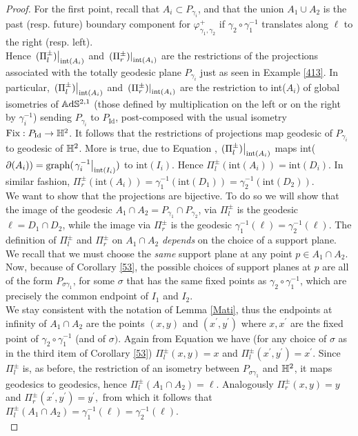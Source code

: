  \begin{proof}
     For the first point, recall that $A_i\subset P_{\gamma_i}$, and that the union $A_1\cup A_2$ is the past (resp. future) boundary component for $\varphi_{\gamma_1,\gamma_2}^+$ if $\gamma_2\circ\gamma_1^{-1}$ translates along $\ell$ to the right (resp. left). \\
     Hence $\left.(\Pi_l^\pm)\right|_{\text{int}(A_i)}$ and $\left.(\Pi_r^\pm)\right|_{\text{int}(A_i)}$ are the restrictions of the projections associated with the totally geodesic plane $P_{\gamma_i}$ just as seen in Example \ref{413}. In particular, $\left.(\Pi_l^\pm)\right|_{\text{int}(A_i)}$ and $\left.(\Pi_r^\pm)\right|_{\text{int}(A_i)}$ are the restriction to int($A_i$) of global isometries of $\mathbb{A}\mathrm{d}\mathbb{S}^{2,1}$ (those defined by multiplication on the left or on the right by $\gamma_i^{-1}$) sending $P_{\gamma_i}$ to $P_{\text{Id}}$, post-composed with the usual isometry $\text{Fix}:P_{\text{Id}}\to\mathbb{H}^2$. It follows that the restrictions of projections map geodesic of $P_{\gamma_i}$ to geodesic of $\mathbb{H}^2$. More is true, due to Equation , $\left.(\Pi_l^\pm)\right|_{\text{int}(A_i)}$ maps int($\partial(A_i))=\text{graph(\ensuremath{\left.\gamma_i^{-1}\right|_{\text{int}(I_i)}})}$ to $\text{int}(I_i).$ Hence $\Pi_l^\pm(\text{int}(A_i))=\text{int}(D_i)$. In similar fashion, $\Pi_r^\pm(\text{int}(A_i))=\gamma_1^{-1}(\text{int}(D_1))=\gamma_2^{-1}(\text{int}(D_2)).$\\
  We want to show that the projections are bijective. To do so we will show that the image of the geodesic $A_1\cap A_2=P_{\gamma_1}\cap P_{\gamma_2}$, via $\Pi_l^\pm$ is the geodesic $\ell=D_{1}\cap D_2$, while the image via $\Pi_r^\pm$ is the geodesic $\gamma_1^{-1}(\ell)=\gamma_2^{-1}(\ell).$ The definition of $\Pi_l^\pm$ and $\Pi_r^\pm$ on $A_1\cap A_2$ \textit{depends} on the choice of a support plane. We recall that we must choose the \textit{same} support plane at any point $p\in A_1\cap A_2$. Now, because of Corollary \ref{53}, the possible choices of support planes at $p$ are all of the form $P_{\sigma\gamma_1}$, for some $\sigma$ that has the same fixed points as $\gamma_2\circ\gamma_1^{-1}$, which are precisely the common endpoint of $I_1$ and $I_2$. \\
  We stay consistent with the notation of Lemma \ref{Mati}, thus the endpoints at infinity of $A_1\cap A_2$ are the points $(x,y)$ and $(x^{\prime},y^{\prime})$ where $x,x^{\prime} $ are the fixed point of $\gamma_2\circ\gamma_1^{-1}$ (and of $\sigma)$. Again from Equation  we have (for any choice of $\sigma$ as in the third item of Corollary \ref{53}) $\Pi_l^\pm(x,y)=x$ and $\Pi_l^\pm(x^{\prime} ,y^{\prime} )=x^{\prime}.$ Since $\Pi_l^\pm$ is, as before, the restriction of an isometry between $P_{\sigma\gamma_1}$ and $\mathbb{H}^2$, it maps geodesics to geodesics, hence $\Pi_l^\pm(A_1\cap A_2)=\ell.$ Analogously $\Pi_r^\pm(x,y)=y$ and $\Pi_r^\pm(x^{\prime},y^{\prime})=y^{\prime},$ from which it follows that $\Pi_l^\pm(A_1\cap A_2)=\gamma_1^{-1}(\ell)=\gamma_2^{-1}(\ell).$ \\

\end{proof}
